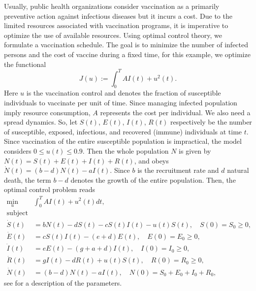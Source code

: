Usually, public health organizations consider vaccination as a
primarily preventive action against infectious diseases but it incurs a cost.%
Due to the limited resources associated with vaccination programs, it is imperative
to optimize the use of available resources. Using optimal control theory, we
formulate a vaccination schedule. The goal is to minimize the number of infected
persons and the cost of vaccine during a fixed time, for this example, we 
optimize the functional
$$
  J(u):= 
  \int_{0}^{T}
    A I(t) + u^2(t) .
$$
Here $u$ is the vaccination control and denotes the fraction of
susceptible individuals to vaccinate per unit of time. Since managing infected 
population imply resource consumption, $A$ represents the cost per individual.
We also need a spread dynamics. So, let $S(t)$, $E(t)$, $I(t)$, $R(t)$
respectively be the number of susceptible, exposed, infectious, and recovered
(immune) individuals at time $t$. Since vaccination of
the entire susceptible population is impractical, the model considers 
$0 \leq u(t) \leq 0.9$. Then the whole population $N$ is given by 
$N(t) = S(t) + E(t) + I(t) + R (t)$, and obeys
$
  \dot{N}(t) =
    (b - d)N(t) - aI(t).
$
Since $b$ is the recruitment rate and $d$ natural death, the term $b-d$ denotes 
the growth of the entire population. Then, the optimal control problem reads
%
%
\begin{equation} \label{eqn:epidemics_lenhart}
  \begin{aligned}
    \min_{u} & \int_{0}^{T} AI(t) + u^{2}(t) dt,
    \\
    \text{subject to}
    \\
      \dot{S}(t) &=
          bN(t) - dS(t) - cS(t)I(t) - u(t)S(t), \quad S(0) = S_0 \geq 0,   \\
      \dot{E}(t) &=
          cS(t)I(t) - (e + d)E(t), \quad E(0) = E_0 \geq 0,    \\
      \dot{I}(t) &=
          eE(t) - (g + a +d)I(t), \quad I(0) = I_0 \geq 0,     \\
      \dot{R}(t) &=
          gI(t) -dR(t) + u(t)S(t), \quad R(0) = R_0 \geq 0,    \\
        \dot{N}(t) &=
          (b - d)N(t) - aI(t), \quad N(0)= S_0 + E_0 + I_0 + R_0, 
  \end{aligned}
\end{equation}
see  for a description of the parameters.

